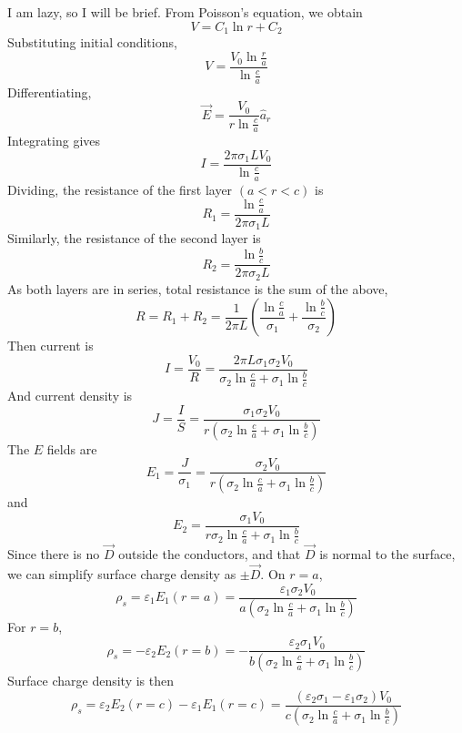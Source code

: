 \documentclass[answers]{exam}
\begin{document}
\begin{questions}
\begin{solution}
	I am lazy, so I will be brief. From Poisson's equation, we obtain
	$$V = C_1\ln r + C_2$$
	Substituting initial conditions,
	$$V = \frac{V_0\ln\frac{r}{a}}{\ln\frac{c}{a}}$$
	Differentiating,
	$$\vec E = \frac{V_0}{r\ln\frac{c}{a}} \hat a_r$$
	Integrating gives
	$$I = \frac{2\pi\sigma_1LV_0}{\ln\frac{c}{a}}$$
	Dividing, the resistance of the first layer $(a<r<c)$ is
	$$R_1 = \frac{\ln\frac{c}{a}}{2\pi\sigma_1L}$$
	Similarly, the resistance of the second layer is
	$$R_2 = \frac{\ln\frac{b}{c}}{2\pi\sigma_2L}$$
	As both layers are in series, total resistance is the sum of the above,
	$$R = R_1 + R_2 = \frac{1}{2\pi L}\left(\frac{\ln\frac{c}{a}}{\sigma_1} + \frac{\ln\frac{b}{c}}{\sigma_2}\right)$$
    Then current is
    $$I = \frac{V_0}{R} = \frac{2\pi L\sigma_1\sigma_2V_0}{\sigma_2\ln\frac{c}{a} + \sigma_1\ln\frac{b}{c}}$$
    And current density is
    $$J = \frac{I}{S} = \frac{\sigma_1\sigma_2V_0}{r\left(\sigma_2\ln\frac{c}{a} + \sigma_1\ln\frac{b}{c}\right)}$$
    The $E$ fields are
    $$E_1 = \frac{J}{\sigma_1} = \frac{\sigma_2V_0}{r\left(\sigma_2\ln\frac{c}{a} + \sigma_1\ln\frac{b}{c}\right)}$$
    and
    $$E_2 = \frac{\sigma_1V_0}{r\sigma_2\ln\frac{c}{a} + \sigma_1\ln\frac{b}{c}}$$
    Since there is no $\vec D$ outside the conductors, and that $\vec D$ is normal to the surface, we can simplify surface charge density as $\pm\vec D$. On $r=a$,
    $$\rho_s = \varepsilon_1E_1(r=a) = \frac{\varepsilon_1\sigma_2V_0}{a\left(\sigma_2\ln\frac{c}{a} + \sigma_1\ln\frac{b}{c}\right)}$$
    For $r=b$,
    $$\rho_s = -\varepsilon_2E_2(r=b) = -\frac{\varepsilon_2\sigma_1V_0}{b\left(\sigma_2\ln\frac{c}{a} + \sigma_1\ln\frac{b}{c}\right)}$$
    Surface charge density is then
    $$\rho_s = \varepsilon_2E_2(r=c) - \varepsilon_1E_1(r=c) = \frac{(\varepsilon_2\sigma_1-\varepsilon_1\sigma_2)V_0}{c\left(\sigma_2\ln\frac{c}{a} + \sigma_1\ln\frac{b}{c}\right)}$$
\end{solution}



\end{questions}
\end{document}
